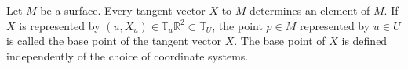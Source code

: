 Let $M$ be a surface. Every tangent vector $X$ to $M$ determines an element of $M$. If $X$ is represented by $(u, X_u) \in \mathbb{T}_u \mathbb{R}^2 \subset \mathbb{T}_U$, the point $p \in M$ represented by $u \in U$ is called the base point of the tangent vector $X$. The base point of $X$ is defined independently of the choice of coordinate systems.
